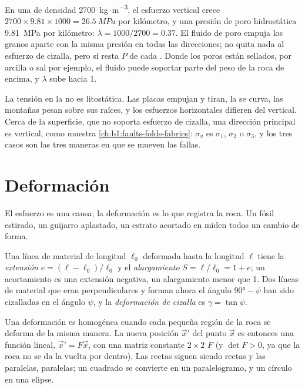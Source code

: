 En una  de densidad \qty{2700}{kg.m^{-3}}, el esfuerzo vertical crece $2700\times9.81\times1000 = \qty{26.5}{MPa}$ por kilómetro, y una presión de
poro hidrostática \qty{9.81}{MPa} por kilómetro: $\lambda = 1000/2700 = 0.37$. El fluido de poro empuja los granos aparte con la misma presión en todas
las direcciones; no quita nada al esfuerzo de cizalla, pero sí resta $P$ de cada . Donde los poros están sellados, por arcilla o sal por
ejemplo, el fluido puede soportar parte del peso de la roca de encima, y $\lambda$ sube hacia 1.

La tensión en la  no es litostática. Las placas empujan y tiran, la  se curva, las montañas pesan sobre sus raíces, y los esfuerzos
horizontales difieren del vertical. Cerca de la superficie, que no soporta esfuerzo de cizalla, una dirección principal es vertical, como muestra
\cref{ch:b1:faults-folds-fabrics}: $\sigma_v$ es $\sigma_1$, $\sigma_2$ o $\sigma_3$, y los tres casos son las tres maneras en que se mueven las fallas.

\section{Deformación}\label{sec:b1:stress-strain-rheology:strain}

El esfuerzo es una causa; la deformación es lo que registra la roca. Un fósil estirado, un guijarro aplastado, un estrato acortado en  miden todos un cambio de forma.

\begin{definition}\label{def:b1:stress-strain-rheology:strain}
Una línea de material de longitud $\ell_0$ deformada hasta la longitud $\ell$ tiene la \emph{extensión} $e = (\ell - \ell_0)/\ell_0$ y
el \emph{alargamiento} $S = \ell/\ell_0 = 1 + e$; un acortamiento es una extensión negativa, un alargamiento menor que 1. Dos líneas de
material que eran perpendiculares y forman ahora el ángulo $\ang{90} - \psi$ han sido cizalladas en el ángulo $\psi$, y la \emph{deformación de
cizalla} es $\gamma = \tan\psi$.
\end{definition}

Una deformación es homogénea cuando cada pequeña región de la roca se deforma de la misma manera. La nueva posición $\vec x'$ del punto $\vec x$ es
entonces una función lineal, $\vec x' = F\vec x$, con una matriz constante $2\times2$ $F$ (y $\det F > 0$, ya que la roca no se da la vuelta por dentro).
Las rectas siguen siendo rectas y las paralelas, paralelas; un cuadrado se convierte en un paralelogramo, y un círculo en una elipse.

